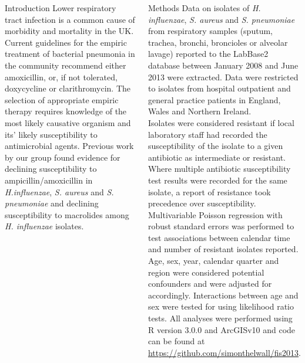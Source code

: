 \documentclass[final, 14pt]{beamer}
\begin{document}
\begin{frame}
\begin{columns}[t]
  \begin{block}{Introduction}
  Lower respiratory tract infection is a common cause of morbidity and mortality in the UK. \citep{Davies2012}
   Current guidelines for the empiric treatment of bacterial pneumonia in the community recommend either amoxicillin, or, if not tolerated, doxycycline or clarithromycin. \citep{Lim2009}
   The selection of appropriate empiric therapy requires knowledge of the most likely causative organism and its' likely susceptibility to antimicrobial agents.
   Previous work by our group found evidence for declining susceptibility to ampicillin/amoxicillin in \textit{H.influenzae}, \textit{S. aureus} and \textit{S. pneumoniae} and declining susceptibility to macrolides among \textit{H. influenzae} isolates. \citep{Blackburn2011}
   \end{block}
  
  \begin{block}{Methods}
   Data on isolates of \textit{H. influenzae}, \textit{S. aureus} and \textit{S. pneumoniae} from respiratory samples (sputum, trachea, bronchi, broncioles or alveolar lavage) reported to the LabBase2 database between January 2008 and June 2013 were extracted. 
   Data were restricted to isolates from hospital outpatient and general practice patients in England, Wales and Northern Ireland.\\
   Isolates were considered resistant if local laboratory staff had recorded the susceptibility of the isolate to a given antibiotic as intermediate or resistant. 
   Where multiple antibiotic susceptibility test results were recorded for the same isolate, a report of resistance took precedence over susceptibility. \\
   Multivariable Poisson regression with robust standard errors was performed to test associations between calendar time and number of resistant isolates reported.
   Age, sex, year, calendar quarter and region were considered potential confounders and were adjusted for accordingly.
   Interactions between age and sex were tested for using likelihood ratio tests. 
   All analyses were performed using R version 3.0.0 and ArcGIS\texttrademark v10 and code can be found at \url{https://github.com/simonthelwall/fis2013}.
  \end{block}
  

\end{columns}
\end{frame}
\end{document}
